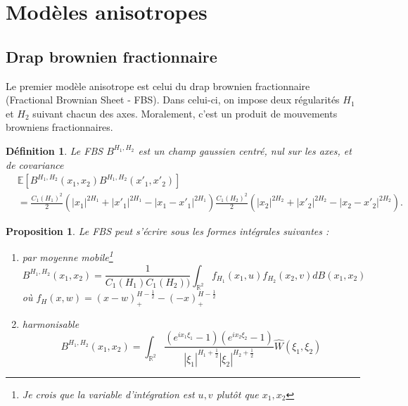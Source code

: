 \documentclass[11pt]{article} %
\newtheorem{definition}{Définition}[section]
\newtheorem{proposition}{Proposition}[section]
\begin{document}
\section{Modèles anisotropes}
\subsection{Drap brownien fractionnaire}
Le premier modèle anisotrope est celui du drap brownien fractionnaire (Fractional Brownian Sheet - FBS). Dans celui-ci, on impose deux régularités $H_1$ et $H_2$ suivant chacun des axes. Moralement, c'est un produit de mouvements browniens fractionnaires.
\begin{definition}
	Le FBS $B^{H_1, H_2}$ est un champ gaussien centré, nul sur les axes, et de covariance
	\begin{align*}
		&\mathbb{E}\left[ B^{H_1, H_2}(x_1, x_2)B^{H_1, H_2}(x'_1, x'_2)\right]\\
			&= \frac{C_1(H_1)^2}{2} \left( |x_1|^{2H_1} + |x'_1|^{2H_1} -|x_1 - x'_1|^{2H_1}\right) \frac{C_1(H_2)^2}{2} \left( |x_2|^{2H_2} + |x'_2|^{2H_2} -|x_2 - x'_2|^{2H_2}\right) .
	\end{align*}
\end{definition}
\begin{proposition}
	Le FBS peut s'écrire sous les formes intégrales suivantes :
	\begin{enumerate}
		\item par moyenne mobile\footnote{Je crois que la variable d'intégration est $u,v$ plutôt que $x_1, x_2$}
			\begin{equation}
				B^{H_1, H_2}(x_1, x_2) = \frac{1}{C_1(H_1)C_1(H_2))}\int_{\mathbb{R}^2} f_{H_1}(x_1,u)f_{H_2}(x_2,v)dB(x_1, x_2)
			\end{equation}
			où $f_H(x,w) = (x - w)_+^{H - \frac{1}{2}} - (-x)_+^{H-\frac{1}{2}}$
		\item harmonisable
			\begin{equation}
				B^{H_1, H_2}(x_1, x_2) = \int_{\mathbb{R}^2} \frac{ (e^{ix_1\xi_1} - 1)(e^{ix_2\xi_2} - 1)}{|\xi_1|^{H_1 + \frac{1}{2}}|\xi_2|^{H_2 + \frac{1}{2}}}\hat{W}(\xi_1, \xi_2)
			\end{equation}
	\end{enumerate}
\end{proposition}
\end{document}
